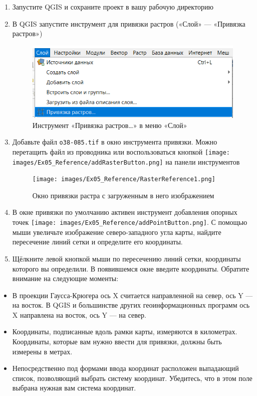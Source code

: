 \documentclass[
  12pt,
]{book}
\begin{document}
\begin{enumerate}
\def\labelenumi{\arabic{enumi}.}
\item
  Запустите QGIS и сохраните проект в вашу рабочую директорию
\item
  В QGIS запустите инструмент для привязки растров («Слой» --- «Привязка растров»)

  \begin{figure}
  \centering
  \includegraphics{images/Ex05_Reference/RasterReference0.png}
  \caption{Инструмент «Привязка растров\ldots» в меню «Слой»}
  \end{figure}
\item
  Добавьте файл \texttt{o38-085.tif} в окно инструмента привязки. Можно перетащить файл из проводника или воспользоваться кнопкой \texttt{[image: images/Ex05\_Reference/addRasterButton.png]} на панели инструментов

  \begin{figure}
  \centering
  \texttt{[image: images/Ex05\_Reference/RasterReference1.png]}
  \caption{Окно привязки растра с загруженным в него изображением}
  \end{figure}
\item
  В окне привязки по умолчанию активен инструмент добавления опорных точек \texttt{[image: images/Ex05\_Reference/addPointButton.png]}. С помощью мыши увеличьте изображение северо-западного угла карты, найдите пересечение линий сетки и определите его координаты.
\item
  Щёлкните левой кнопкой мыши по пересечению линий сетки, координаты которого вы определили. В появившемся окне введите координаты. Обратите внимание на следующие моменты:
\end{enumerate}

\begin{itemize}
\item
  В проекции Гаусса-Крюгера ось X считается направленной на север, ось Y --- на восток. В QGIS и большинстве других геоинформационных программ ось X направлена на восток, ось Y --- на север.
\item
  Координаты, подписанные вдоль рамки карты, измеряются в километрах. Координаты, которые вам нужно ввести для привязки, должны быть измерены в метрах.
\item
  Непосредственно под формами ввода координат расположен выпадающий список, позволяющий выбрать систему координат. Убедитесь, что в этом поле выбрана нужная вам система координат.
\end{itemize}
\end{document}
